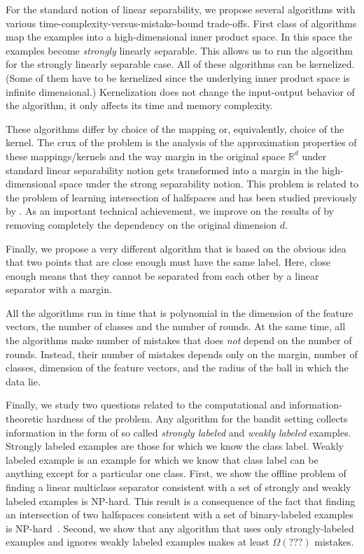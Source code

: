 \documentclass[12pt]{article}
\newcommand{\R}{\mathbb{R}}  %
\begin{document}
For the standard notion of linear separability, we propose several algorithms
with various time-complexity-versus-mistake-bound trade-offs. First class of
algorithms map the examples into a high-dimensional inner product space. In this
space the examples become \emph{strongly} linearly separable. This allows us to
run the algorithm for the strongly linearly separable case. All of these
algorithms can be kernelized. (Some of them have to be kernelized since the
underlying inner product space is infinite dimensional.) Kernelization does not
change the input-output behavior of the algorithm, it only affects its time
and memory complexity.

These algorithms differ by choice of the mapping or, equivalently, choice of the
kernel. The crux of the problem is the analysis of the approximation properties
of these mappings/kernels and the way margin in the original space $\R^d$ under
standard linear separability notion gets transformed into a margin in the
high-dimensional space under the strong separability notion. This problem is
related to the problem of learning intersection of halfspaces and has been
studied previously by \cite{Klivans-Servedio-2008}. As an important technical
achievement, we improve on the results of \cite{Klivans-Servedio-2008} by
removing completely the dependency on the original dimension $d$.

Finally, we propose a very different algorithm that is based on the obvious idea
that two points that are close enough must have the same label. Here, close
enough means that they cannot be separated from each other by a linear separator
with a margin.

All the algorithms run in time that is polynomial in the dimension of the
feature vectors, the number of classes and the number of rounds. At the same
time, all the algorithms make number of mistakes that does \emph{not} depend
on the number of rounds. Instead, their number of mistakes depends only on the
margin, number of classes, dimension of the feature vectors, and the radius of
the ball in which the data lie.

Finally, we study two questions related to the computational and
information-theoretic hardness of the problem. Any algorithm for the bandit
setting collects information in the form of so called \emph{strongly labeled}
and \emph{weakly labeled} examples. Strongly labeled examples are those for
which we know the class label. Weakly labeled example is an example for which we
know that class label can be anything except for a particular one class. First,
we show the offline problem of finding a linear multiclass separator consistent
with a set of strongly and weakly labeled examples is NP-hard. This result is a
consequence of the fact that finding an intersection of two halfspaces
consistent with a set of binary-labeled examples is
NP-hard~\citep{Blum-Rivest-1993}. Second, we show that any algorithm that uses
only strongly-labeled examples and ignores weakly labeled examples makes at
least $\Omega(???)$ mistakes.
\end{document}
